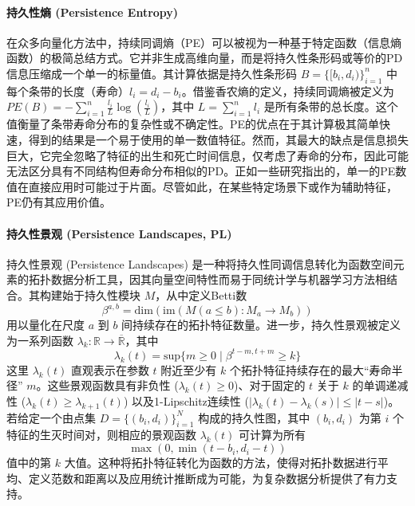 \paragraph{持久性熵 (Persistence Entropy)}
\label{sec:feat_pe}
在众多向量化方法中，持续同调熵（PE）\cite{atienza2020stability}可以被视为一种基于特定函数（信息熵函数）的极简总结方式。它并非生成高维向量，而是将持久性条形码或等价的PD信息压缩成一个单一的标量值。其计算依据是持久性条形码 $B = \{[b_i, d_i)\}_{i=1}^n$ 中每个条带的长度（寿命）$l_i = d_i - b_i$。借鉴香农熵的定义，持续同调熵被定义为 $PE(B) = -\sum_{i=1}^{n} \frac{l_i}{L} \log(\frac{l_i}{L})$，其中 $L = \sum_{i=1}^{n} l_i$ 是所有条带的总长度。这个值衡量了条带寿命分布的复杂性或不确定性。PE的优点在于其计算极其简单快速，得到的结果是一个易于使用的单一数值特征。然而，其最大的缺点是信息损失巨大，它完全忽略了特征的出生和死亡时间信息，仅考虑了寿命的分布，因此可能无法区分具有不同结构但寿命分布相似的PD。正如一些研究指出的，单一的PE数值在直接应用时可能过于片面。尽管如此，在某些特定场景下或作为辅助特征，PE仍有其应用价值。

\paragraph{持久性景观 (Persistence Landscapes, PL)}
\label{sec:feat_pl}
持久性景观 (Persistence Landscapes) \cite{1} 是一种将持久性同调信息转化为函数空间元素的拓扑数据分析工具，因其向量空间特性而易于同统计学与机器学习方法相结合。其构建始于持久性模块 $M$，从中定义Betti数
\begin{equation}
    \label{eq:betti_number} %
    \beta^{a,b} = \text{dim}(\text{im}(M(a \le b): M_a \rightarrow M_b))
\end{equation}
用以量化在尺度 $a$ 到 $b$ 间持续存在的拓扑特征数量。进一步，持久性景观被定义为一系列函数 $\lambda_k: \mathbb{R} \rightarrow \overline{\mathbb{R}}$，其中
\begin{equation}
    \label{eq:lambda_k_definition}
    \lambda_k(t) = \text{sup}\{m \ge 0 \mid \beta^{t-m,t+m} \ge k\}
\end{equation}
这里 $\lambda_k(t)$ 直观表示在参数 $t$ 附近至少有 $k$ 个拓扑特征持续存在的最大“寿命半径” $m$。这些景观函数具有非负性 ($\lambda_k(t) \ge 0$)、对于固定的 $t$ 关于 $k$ 的单调递减性 ($\lambda_k(t) \ge \lambda_{k+1}(t)$) 以及1-Lipschitz连续性 ($|\lambda_k(t) - \lambda_k(s)| \le |t-s|$)。若给定一个由点集 $D = \{(b_i, d_i)\}_{i=1}^N$ 构成的持久性图，其中 $(b_i,d_i)$ 为第 $i$ 个特征的生灭时间对，则相应的景观函数 $\lambda_k(t)$ 可计算为所有
\begin{equation}
    \label{eq:lambda_k_from_diagram_core}
    \max(0, \min(t-b_i, d_i-t))
\end{equation}
值中的第 $k$ 大值。这种将拓扑特征转化为函数的方法，使得对拓扑数据进行平均、定义范数和距离以及应用统计推断成为可能，为复杂数据分析提供了有力支持。

